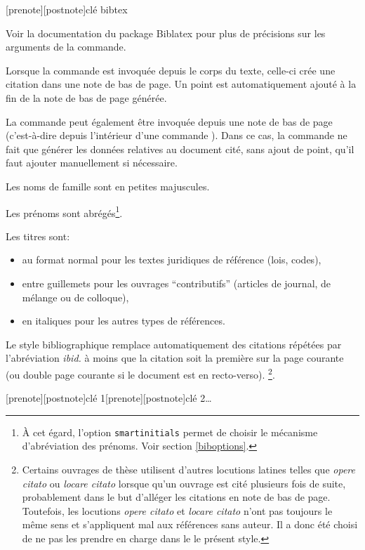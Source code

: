 \documentclass{ltxdockit}
\newcommand*{\biblatex}{Biblatex\xspace}
\newcommand*{\bibstylename}{droit-fr\xspace}
\begin{document}
\begin{ltxsyntax}

[prenote][postnote]{clé bibtex}

Voir la documentation du package \biblatex pour plus de précisions sur les arguments de la commande.

Lorsque la commande est invoquée depuis le corps du texte, celle-ci crée une citation dans une note de bas de page. Un point est automatiquement ajouté à la fin de la note de bas de page générée.

La commande peut également être invoquée depuis une note de bas de page (c'est-à-dire depuis l'intérieur d'une commande ). Dans ce cas, la commande  ne fait que générer les données relatives au document cité, sans ajout de point, qu'il faut ajouter manuellement si nécessaire.

Les noms de famille sont en petites majuscules.

Les prénoms sont abrégés\footnote{À cet égard, l'option \texttt{smartinitials} permet de choisir le mécanisme d'abréviation des prénoms. Voir section \ref{biboptions}.}.

Les titres sont:
\begin{itemize}
\item au format normal pour les textes juridiques de référence (lois, codes),
\item entre guillemets pour les ouvrages \enquote{contributifs} (articles de journal, de mélange ou de colloque),
\item en italiques pour les autres types de références.
\end{itemize}

Le style bibliographique \sty{\bibstylename} remplace automatiquement des citations répétées par l'abréviation \textit{ibid.} à moins que la citation soit la première sur la page courante (ou double page courante si le document est en recto-verso).
\footnote{
Certains ouvrages de thèse utilisent d'autres locutions latines telles que \textit{opere citato} ou \textit{locare citato} lorsque qu'un ouvrage est cité plusieurs fois de suite, probablement dans le but d'alléger les citations en note de bas de page. Toutefois, les locutions \textit{opere citato} et \textit{locare citato} n'ont pas toujours le même sens et s'appliquent mal aux références sans auteur. Il a donc été choisi de ne pas les prendre en charge dans le le présent style.
}.

[prenote][postnote]{clé 1}[prenote][postnote]{clé 2}\ldots


\end{ltxsyntax}
\end{document}
